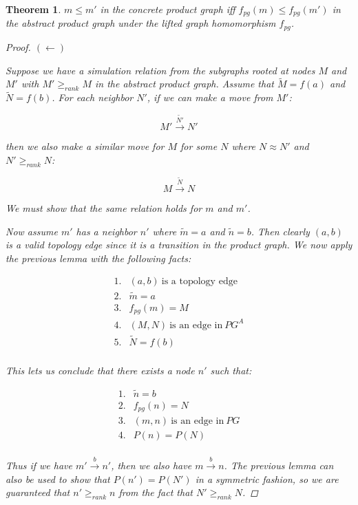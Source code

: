 \documentclass[twocolumn]{sig-alternate-10pt}
\newtheorem{thm}{Theorem}[section]
\begin{document}
\begin{thm}
  $m \leq m'$ in the concrete product graph iff $f_{pg}(m) \leq f_{pg}(m')$ in the abstract product graph under the lifted graph homomorphism $f_{pg}$.

  \begin{proof}
    $(\leftarrow)$

    Suppose we have a simulation relation from the subgraphs rooted at nodes $M$ and $M'$ with $M' \geq_{rank} M$ in the abstract product graph. Assume that $\tilde{M} = f(a)$ and $\tilde{N} = f(b)$. For each neighbor $N'$, if we can make a move from $M'$:

    $$M' \overset{\tilde{N'}}{\rightarrow} N'$$

    then we also make a similar move for $M$ for some $N$ where $N \approx N'$ and $N' \geq_{rank} N$:

    $$M \overset{\tilde{N}}{\rightarrow} N$$

    We must show that the same relation holds for $m$ and $m'$. 

    Now assume $m'$ has a neighbor $n'$ where $\tilde{m} = a$ and $\tilde{n} = b$. Then clearly $(a,b)$ is a valid topology edge since it is a transition in the product graph. We now apply the previous lemma with the following facts:

    \[ \begin{array}{ll}
      1. & (a,b) ~\text{is a topology edge} \\
      2. & \tilde{m} = a \\
      3. & f_{pg}(m) = M \\
      4. & (M,N) ~\text{is an edge in}~ PG^A \\
      5. & \tilde{N} = f(b) \\
    \end{array} \]

    This lets us conclude that there exists a node $n'$ such that:

    \[ \begin{array}{ll}
      1. & \tilde{n} = b \\
      2. & f_{pg}(n) = N \\
      3. & (m,n) ~\text{is an edge in}~ PG \\
      4. & P(n) = P(N) \\
    \end{array} \] 

    Thus if we have $m' \overset{b}{\rightarrow} n'$, then we also have $m \overset{b}{\rightarrow} n$. The previous lemma can also be used to show that $P(n') = P(N')$ in a symmetric fashion, so we are guaranteed that $n' \geq_{rank} n$ from the fact that $N' \geq_{rank} N$.


\end{proof}
\end{thm}
\end{document}
